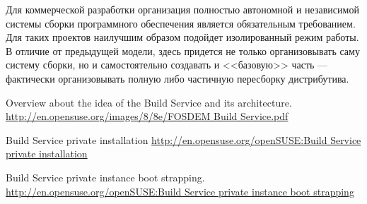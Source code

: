 \documentclass[10pt, a5paper]{article}
\begin{document}
Для коммерческой разработки организация полностью автономной и независимой системы сборки программного обеспечения является обязательным требованием. Для таких проектов наилучшим образом подойдет изолированный режим работы. В отличие от предыдущей модели, здесь придется не только организовывать саму систему сборки, но и самостоятельно создавать 
и <<базовую>> часть \cite{Pynkin3} --- фактически организовывать полную либо частичную пересборку дистрибутива.


\begin{thebibliography}{9}

 Overview about the idea of the Build Service and its architecture.
\url{http://en.opensuse.org/images/8/8e/FOSDEM Build Service.pdf}

 Build Service private installation \url{http://en.opensuse.org/openSUSE:Build Service private installation}

 Build Service private instance boot strapping.
\url{http://en.opensuse.org/openSUSE:Build Service private instance boot strapping}

\end{thebibliography}
\end{document}
